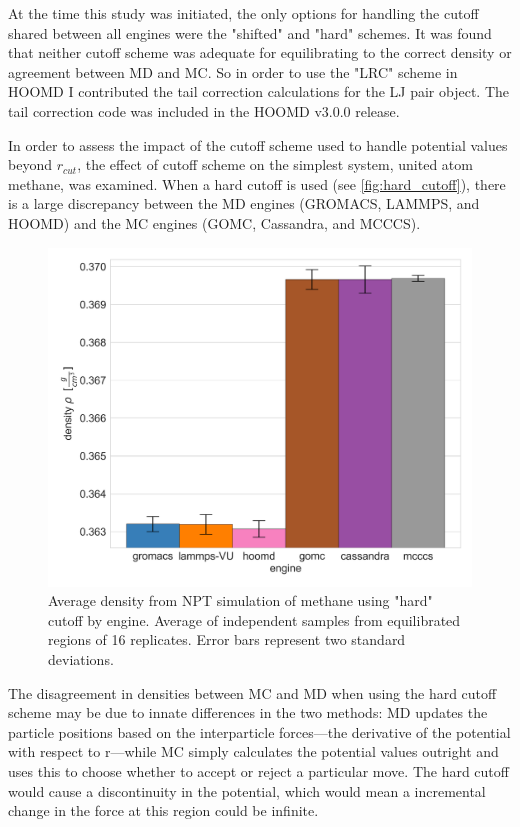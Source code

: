 At the time this study was initiated, the only options for handling the cutoff shared between all engines were the "shifted" and "hard" schemes.
It was found that neither cutoff scheme was adequate for equilibrating to the correct density or agreement between MD and MC.
So in order to use the "LRC" scheme in HOOMD I contributed the tail correction calculations for the LJ pair object. 
The tail correction code was included in the HOOMD v3.0.0 release.

In order to assess the impact of the cutoff scheme used to handle potential values beyond $r_{cut}$, the effect of cutoff scheme on the simplest system, united atom methane, was examined. 
When a hard cutoff is used (see \autoref{fig:hard_cutoff}), there is a large discrepancy between the MD engines (GROMACS, LAMMPS, and HOOMD) and the MC engines (GOMC, Cassandra, and MCCCS). 
\begin{figure}[h!]
    \centering
    \includegraphics[width=0.8\linewidth,keepaspectratio]{figures/rep_study/hard_cutoff.png}
    \caption{Average density from NPT simulation of methane using "hard" cutoff by engine. Average of independent samples from equilibrated regions of 16 replicates. Error bars represent two standard deviations.}\label{fig:hard_cutoff}
\end{figure}
The disagreement in densities between MC and MD when using the hard cutoff scheme may be due to innate differences in the two methods: MD updates the particle positions based on the interparticle forces---the derivative of the potential with respect to r---while MC simply calculates the potential values outright and uses this to choose whether to accept or reject a particular move.
The hard cutoff would cause a discontinuity in the potential, which would mean a incremental change in the force at this region could be infinite.

